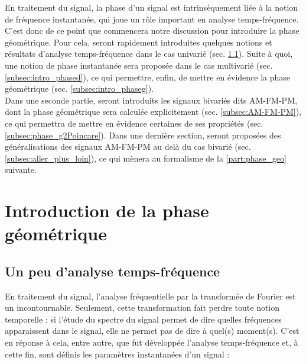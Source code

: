 
En traitement du signal, la phase d'un signal est intrinsèquement liée à la notion de fréquence instantanée, qui joue un rôle important en analyse temps-fréquence. 
C'est donc de ce point que commencera notre discussion pour introduire la phase géométrique.
Pour cela, seront rapidement introduites quelques notions et résultats d'analyse temps-fréquence dans le cas univarié (sec. \ref{subsec:ana_temp-freq}). Suite à quoi, une notion de phase instantanée sera proposée dans le cas multivarié (sec. \ref{subsec:intro_phased}), ce qui permettre, enfin, de mettre en évidence la phase géométrique (sec. \ref{subsec:intro_phaseg}).
\\

Dans une seconde partie, seront introduits les signaux bivariés dits AM-FM-PM, dont la phase géométrique sera calculée explicitement (sec. \ref{subsec:AM-FM-PM}), ce qui permettra de mettre en évidence certaines de ses propriétés (sec. \ref{subsec:phase_g2Poincare}). Dans une dernière section, seront proposées des généralisations des signaux AM-FM-PM au delà du cas bivarié (sec. \ref{subsec:aller_plus_loin}), ce qui mènera au formalisme de la \cref{part:phase_geo} suivante.
\\




\section{Introduction de la phase géométrique} \label{sec:intro_phaseg}

\subsection{Un peu d'analyse temps-fréquence} \label{subsec:ana_temp-freq}

En traitement du signal, l'analyse fréquentielle par la transformée de Fourier est un incontournable. 
Seulement, cette transformation fait perdre toute notion temporelle : si l'étude du spectre du signal permet de dire quelles fréquences apparaissent dans le signal, elle ne permet pas de dire à quel(s) moment(s). 
C'est en réponse à cela, entre autre, que fut développée l'analyse temps-fréquence et, à cette fin, sont définis les paramètres instantanées d'un signal :\par

